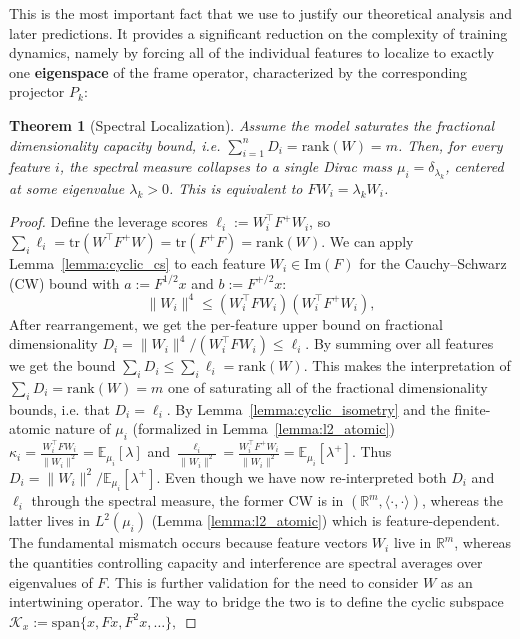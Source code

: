 \documentclass{article}
\theoremstyle{plain}
\newtheorem{theorem}{Theorem}
\numberwithin{equation}{section}
\theoremstyle{definition}
\theoremstyle{remark}
\begin{document}
This is the most important fact that we use to justify our theoretical analysis and later predictions. It provides a significant reduction on the complexity of training dynamics, namely by forcing all of the individual features to localize to exactly one \textbf{eigenspace} of the frame operator, characterized by the corresponding projector $P_k$:
\begin{lemmaproofbox}
\begin{theorem}[Spectral Localization]\label{theorem:spectral_localization}
    Assume the model saturates the fractional dimensionality capacity bound, i.e. $\sum_{i=1}^n D_i = \text{rank}(W) = m$. Then, for every feature $i$, the spectral measure collapses to a single Dirac mass $\mu_i = \delta_{\lambda_k}$, centered at some eigenvalue $\lambda_k>0$. This is equivalent to $FW_i = \lambda_kW_i$.
\end{theorem}
\begin{proof}
Define the leverage scores $\ell_i:=W_i^\top F^+W_i$, so $\sum_i \ell_i=\mathrm{tr}(W^\top F^+W)=\mathrm{tr}(F^+F)=\mathrm{rank}(W)$.
We can apply Lemma~\ref{lemma:cyclic_cs} to each feature $W_i\in\mathrm{Im}(F)$ for the Cauchy--Schwarz (CW) bound with $a:=F^{1/2}x$ and $b:=F^{+/2}x$:
\[
\|W_i\|^4 \le (W_i^\top F W_i)(W_i^\top F^+W_i),
\]
After rearrangement, we get the per-feature upper bound on fractional dimensionality $D_i=\|W_i\|^4/(W_i^\top F W_i)\le \ell_i$. By summing over all features we get the bound $\sum_i D_i \le \sum_i \ell_i=\mathrm{rank}(W)$. This makes the interpretation of $\sum_i D_i=\mathrm{rank}(W)=m$ one of saturating all of the fractional dimensionality bounds, i.e. that $D_i = \ell_i$. By Lemma~\ref{lemma:cyclic_isometry} and the finite-atomic nature of $\mu_i$ (formalized in Lemma~\ref{lemma:l2_atomic}) \(\kappa_i=\frac{W_i^\top F W_i}{\|W_i\|^2}=\mathbb{E}_{\mu_i}[\lambda]\) and 
\(\frac{\ell_i}{\|W_i\|^2}=\frac{W_i^\top F^+W_i}{\|W_i\|^2}=\mathbb{E}_{\mu_i}[\lambda^{+}].\) Thus $D_i=\|W_i\|^2/\mathbb{E}_{\mu_i}[\lambda^+]$. Even though we have now re-interpreted both $D_i$ and $\ell_i$  through the spectral measure, the former CW is in $(\mathbb{R}^m, \langle \cdot, \cdot \rangle)$, whereas the latter lives in  $L^2(\mu_i)$ (Lemma \ref{lemma:l2_atomic}) which is feature-dependent. The fundamental mismatch occurs because feature vectors $W_i$ live in $\mathbb{R}^m$, whereas the quantities controlling capacity and interference are spectral averages over eigenvalues of $F$. This is further validation for the need to consider $W$ as an intertwining operator. The way to bridge the two is to define the cyclic subspace \(\mathcal{K}_x:=\mathrm{span}\{x,Fx,F^2x,\dots\},\)

\end{proof}
\end{lemmaproofbox}
\end{document}
